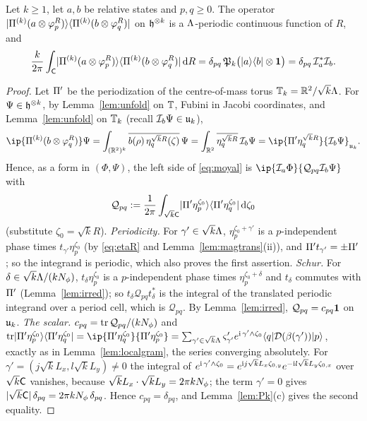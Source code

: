 \begin{theorem}\label{thm:moyal}
Let $k\ge1$, let $a,b$ be relative states and $p,q\ge0$. The operator $\lvert \Pi^{(k)}(a\otimes\varphi_p^R)\rangle\langle \Pi^{(k)}(b\otimes\varphi_q^R)\rvert$ on
$\mathfrak{h}^{\otimes k}$ is a $\Lambda$-periodic continuous function of $R$, and
\begin{equation}\label{eq:moyal}
\frac k{2\pi}\int_{\mathsf{C}}\lvert \Pi^{(k)}(a\otimes\varphi_p^R)\rangle\langle \Pi^{(k)}(b\otimes\varphi_q^R)\rvert\,\mathrm{d} R=\delta_{pq}\,\mathfrak{P}_k\bigl(\lvert a\rangle\langle b\rvert\otimes\mathbf{1}\bigr)=\delta_{pq}\,\mathcal{I}_a^*\mathcal{I}_b .
\end{equation}
\end{theorem}

\begin{proof}
Let $\Pi'$ be the periodization of the centre-of-mass torus $\mathbb{T}_k=\mathbb{R}^2/\sqrt k\Lambda$. For $\Psi\in\mathfrak{h}^{\otimes k}$, by
Lemma~\ref{lem:unfold} on $\mathbb{T}$, Fubini in Jacobi coordinates, and Lemma~\ref{lem:unfold} on $\mathbb{T}_k$ (recall
$\mathcal{I}_b\Psi\in\mathfrak{u}_k$),
\[
\ip{\Pk^{(k)}(b\otimes\varphi_q^R)}\Psi=\int_{(\R^2)^k}\overline{b(\rho)\,\eta_q^{\sqrt kR}(\zeta)}\,\Psi=\int_{\R^2}\overline{\eta_q^{\sqrt kR}}\,\Fib_b\Psi
=\ip{\Pk'\eta_q^{\sqrt kR}}{\Fib_b\Psi}_{\U_k}.
\]
Hence, as a form in $(\Phi,\Psi)$, the left side of \eqref{eq:moyal} is $\ip{\Fib_a\Phi}{\mathcal Q_{pq}\Fib_b\Psi}$ with
\[
\mathcal Q_{pq}:=\frac1{2\pi}\int_{\sqrt k\mathsf{C}}\lvert \Pi'\eta_p^{\zeta_0}\rangle\langle \Pi'\eta_q^{\zeta_0}\rvert\,\mathrm{d}\zeta_0
\]
(substitute $\zeta_0=\sqrt kR$). \emph{Periodicity.} For $\gamma'\in\sqrt k\Lambda$, $\eta_p^{\zeta_0+\gamma'}$ is a $p$-independent phase times
$t_{\gamma'}\eta_p^{\zeta_0}$ (by \eqref{eq:etaR} and Lemma~\ref{lem:magtrans}(ii)), and $\Pi't_{\gamma'}=\pm\Pi'$; so the integrand is
periodic, which also proves the first assertion. \emph{Schur.} For $\delta\in\sqrt k\Lambda/(kN_{\phi})$, $t_\delta\eta_p^{\zeta_0}$ is a
$p$-independent phase times $\eta_p^{\zeta_0+\delta}$ and $t_\delta$ commutes with $\Pi'$ (Lemma~\ref{lem:irred}); so
$t_\delta\mathcal Q_{pq}t_\delta^*$ is the integral of the translated periodic integrand over a period cell, which is
$\mathcal Q_{pq}$. By Lemma~\ref{lem:irred}, $\mathcal Q_{pq}=c_{pq}\mathbf{1}$ on $\mathfrak{u}_k$. \emph{The scalar.} $c_{pq}=\operatorname{tr}\mathcal Q_{pq}/(kN_{\phi})$ and
$\tr\kb{\Pk'\eta_p^{\zeta_0}}{\Pk'\eta_q^{\zeta_0}}=\ip{\Pk'\eta_q^{\zeta_0}}{\Pk'\eta_p^{\zeta_0}}
=\sum_{\gamma'\in\sqrt k\Lam}\varsigma'_{\gamma'}e^{\iu\,\gamma'\wedge\zeta_0}\bra q\Dis(\beta(\gamma'))\ket p$, exactly as in
Lemma~\ref{lem:localgram}, the series converging absolutely. For $\gamma'=(j\sqrt kL_x,l\sqrt kL_y)\neq0$ the integral of
$e^{\mathrm{i}\,\gamma'\wedge\zeta_0}=e^{\mathrm{i} j\sqrt kL_x\zeta_{0,y}}e^{-\mathrm{i} l\sqrt kL_y\zeta_{0,x}}$ over $\sqrt k\mathsf{C}$ vanishes, because
$\sqrt kL_x\cdot\sqrt kL_y=2\pi kN_{\phi}$; the term $\gamma'=0$ gives $\lvert\sqrt k\mathsf{C}\rvert\,\delta_{pq}=2\pi kN_{\phi}\,\delta_{pq}$. Hence
$c_{pq}=\delta_{pq}$, and Lemma~\ref{lem:Pk}(c) gives the second equality.
\end{proof}

